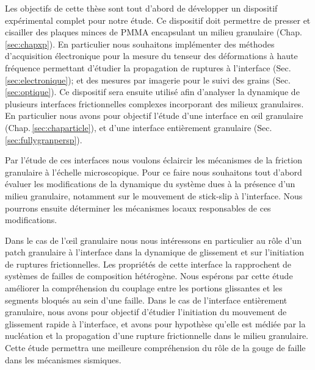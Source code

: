 Les objectifs de cette thèse sont tout d'abord de développer un dispositif expérimental complet pour notre étude. Ce dispositif doit permettre de presser et cisailler des plaques minces de PMMA encapsulant un milieu granulaire (Chap.\,\ref{sec:chapxp}). En particulier nous souhaitons implémenter des méthodes d'acquisition électronique pour la mesure du tenseur des déformations à haute fréquence permettant d'étudier la propagation de ruptures à l'interface (Sec.\,\ref{sec:electronique}); et des mesures par imagerie pour le suivi des grains (Sec.\,\ref{sec:optique}). Ce dispositif sera ensuite utilisé afin d'analyser la dynamique de plusieurs interfaces frictionnelles complexes incorporant des milieux granulaires. En particulier nous avons pour objectif l'étude d'une interface en œil granulaire (Chap.\,\ref{sec:chaparticle}), et d'une interface entièrement granulaire (Sec.\,\ref{sec:fullygranpersp}).


Par l'étude de ces interfaces nous voulons éclaircir les mécanismes de la friction granulaire à l'échelle microscopique. Pour ce faire nous souhaitons tout d'abord évaluer les modifications de la dynamique du système dues à la présence d'un milieu granulaire, notamment sur le mouvement de stick-slip à l'interface. Nous pourrons ensuite déterminer les mécanismes locaux responsables de ces modifications.

Dans le cas de l'œil granulaire nous nous intéressons en particulier au rôle d'un patch granulaire à l'interface dans la dynamique de glissement et sur l'initiation de ruptures frictionnelles. Les propriétés de cette interface la rapprochent de systèmes de failles de composition hétérogène. Nous espérons par cette étude améliorer la compréhension du couplage entre les portions glissantes et les segments bloqués au sein d'une faille. Dans le cas de l'interface entièrement granulaire, nous avons pour objectif d'étudier l'initiation du mouvement de glissement rapide à l'interface, et avons pour hypothèse qu'elle est médiée par la nucléation et la propagation d'une rupture frictionnelle dans le milieu granulaire. Cette étude permettra une meilleure compréhension du rôle de la gouge de faille dans les mécanismes sismiques.




